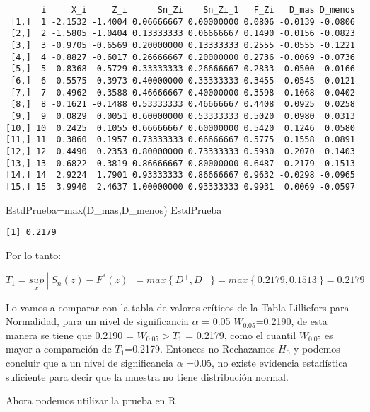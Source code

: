 \documentclass[
  a4paper,
  oneside,
  openany]{book}
\newenvironment{Shaded}{\begin{snugshade}}{\end{snugshade}}
\newcommand{\FunctionTok}[1]{\textcolor[rgb]{0.00,0.00,0.00}{#1}}
\newcommand{\NormalTok}[1]{#1}
\newcommand{\OtherTok}[1]{\textcolor[rgb]{0.56,0.35,0.01}{#1}}
\begin{document}
\begin{verbatim}
       i     X_i     Z_i      Sn_Zi    Sn_Zi_1   F_Zi   D_mas D_menos
 [1,]  1 -2.1532 -1.4004 0.06666667 0.00000000 0.0806 -0.0139 -0.0806
 [2,]  2 -1.5805 -1.0404 0.13333333 0.06666667 0.1490 -0.0156 -0.0823
 [3,]  3 -0.9705 -0.6569 0.20000000 0.13333333 0.2555 -0.0555 -0.1221
 [4,]  4 -0.8827 -0.6017 0.26666667 0.20000000 0.2736 -0.0069 -0.0736
 [5,]  5 -0.8368 -0.5729 0.33333333 0.26666667 0.2833  0.0500 -0.0166
 [6,]  6 -0.5575 -0.3973 0.40000000 0.33333333 0.3455  0.0545 -0.0121
 [7,]  7 -0.4962 -0.3588 0.46666667 0.40000000 0.3598  0.1068  0.0402
 [8,]  8 -0.1621 -0.1488 0.53333333 0.46666667 0.4408  0.0925  0.0258
 [9,]  9  0.0829  0.0051 0.60000000 0.53333333 0.5020  0.0980  0.0313
[10,] 10  0.2425  0.1055 0.66666667 0.60000000 0.5420  0.1246  0.0580
[11,] 11  0.3860  0.1957 0.73333333 0.66666667 0.5775  0.1558  0.0891
[12,] 12  0.4490  0.2353 0.80000000 0.73333333 0.5930  0.2070  0.1403
[13,] 13  0.6822  0.3819 0.86666667 0.80000000 0.6487  0.2179  0.1513
[14,] 14  2.9224  1.7901 0.93333333 0.86666667 0.9632 -0.0298 -0.0965
[15,] 15  3.9940  2.4637 1.00000000 0.93333333 0.9931  0.0069 -0.0597
\end{verbatim}

\begin{Shaded}
\begin{Highlighting}[]
\NormalTok{EstdPrueba}\OtherTok{=}\FunctionTok{max}\NormalTok{(D\_mas,D\_menos)}
\NormalTok{EstdPrueba}
\end{Highlighting}
\end{Shaded}

\begin{verbatim}
[1] 0.2179
\end{verbatim}

Por lo tanto:

\[T_{1}=\underset{x}{sup} \ | \ S_{n}(z)-F^*(z)\ |=max \ \{\ D^+,D^- \ \}=max \ \{ \  0.2179,0.1513 \ \}=0.2179 \]

Lo vamos a comparar con la tabla de valores críticos de la Tabla Lilliefors para Normalidad, para un nivel de significancia \(\alpha\) = 0.05 \(W_{0.05}\)=0.2190, de esta manera se tiene que 0.2190 = \(W_{0.05} > T_{1}\) = 0.2179, como el cuantil \(W_{0.05}\) es mayor a comparación de \(T_{1}\)=0.2179.
Entonces no Rechazamos \(H_0\) y podemos concluir que a un nivel de significancia \(\alpha\) =0.05, no existe evidencia estadística suficiente para decir que la muestra no tiene distribución normal.

Ahora podemos utilizar la prueba en R
\end{document}
